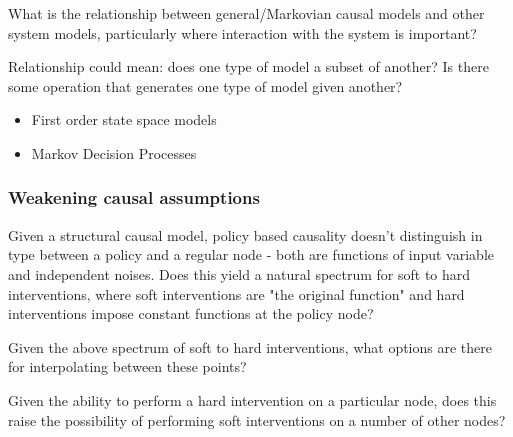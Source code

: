 \begin{question}
    What is the relationship between general/Markovian causal models and other system models, particularly where interaction with the system is important? 
    
    Relationship could mean: does one type of model a subset of another? Is there some operation that generates one type of model given another?
    \begin{itemize}
        \item First order state space models
        \item Markov Decision Processes
    \end{itemize}
\end{question}

\subsubsection{Weakening causal assumptions}

\begin{question}
    Given a structural causal model, policy based causality doesn't distinguish in type between a policy and a regular node - both are functions of input variable and independent noises. Does this yield a natural spectrum for soft to hard interventions, where soft interventions are "the original function" and hard interventions impose constant functions at the policy node?
\end{question}

\begin{question}
    Given the above spectrum of soft to hard interventions, what options are there for interpolating between these points?
\end{question}

\begin{question}\label{q:intervention_cascade}
    Given the ability to perform a hard intervention on a particular node, does this raise the possibility of performing soft interventions on a number of other nodes?
\end{question}



